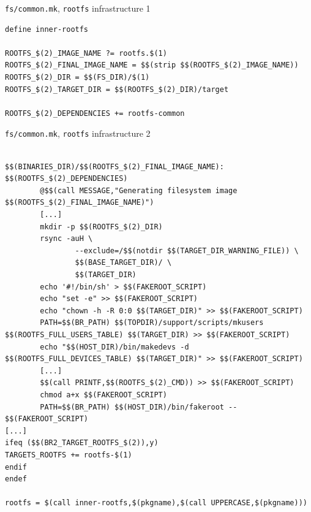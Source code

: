 \begin{frame}[fragile]{{\tt fs/common.mk}, {\tt rootfs} infrastructure 1}
  \begin{block}{}
\begin{verbatim}
define inner-rootfs

ROOTFS_$(2)_IMAGE_NAME ?= rootfs.$(1)
ROOTFS_$(2)_FINAL_IMAGE_NAME = $$(strip $$(ROOTFS_$(2)_IMAGE_NAME))
ROOTFS_$(2)_DIR = $$(FS_DIR)/$(1)
ROOTFS_$(2)_TARGET_DIR = $$(ROOTFS_$(2)_DIR)/target

ROOTFS_$(2)_DEPENDENCIES += rootfs-common
\end{verbatim}
  \end{block}
\end{frame}

\begin{frame}[fragile]{{\tt fs/common.mk}, {\tt rootfs} infrastructure 2}
  \begin{block}{}
\begin{verbatim}

$$(BINARIES_DIR)/$$(ROOTFS_$(2)_FINAL_IMAGE_NAME): $$(ROOTFS_$(2)_DEPENDENCIES)
        @$$(call MESSAGE,"Generating filesystem image $$(ROOTFS_$(2)_FINAL_IMAGE_NAME)")
        [...]
        mkdir -p $$(ROOTFS_$(2)_DIR)
        rsync -auH \
                --exclude=/$$(notdir $$(TARGET_DIR_WARNING_FILE)) \
                $$(BASE_TARGET_DIR)/ \
                $$(TARGET_DIR)
        echo '#!/bin/sh' > $$(FAKEROOT_SCRIPT)
        echo "set -e" >> $$(FAKEROOT_SCRIPT)
        echo "chown -h -R 0:0 $$(TARGET_DIR)" >> $$(FAKEROOT_SCRIPT)
        PATH=$$(BR_PATH) $$(TOPDIR)/support/scripts/mkusers $$(ROOTFS_FULL_USERS_TABLE) $$(TARGET_DIR) >> $$(FAKEROOT_SCRIPT)
        echo "$$(HOST_DIR)/bin/makedevs -d $$(ROOTFS_FULL_DEVICES_TABLE) $$(TARGET_DIR)" >> $$(FAKEROOT_SCRIPT)
        [...]
        $$(call PRINTF,$$(ROOTFS_$(2)_CMD)) >> $$(FAKEROOT_SCRIPT)
        chmod a+x $$(FAKEROOT_SCRIPT)
        PATH=$$(BR_PATH) $$(HOST_DIR)/bin/fakeroot -- $$(FAKEROOT_SCRIPT)
[...]
ifeq ($$(BR2_TARGET_ROOTFS_$(2)),y)
TARGETS_ROOTFS += rootfs-$(1)
endif
endef

rootfs = $(call inner-rootfs,$(pkgname),$(call UPPERCASE,$(pkgname)))
    \end{verbatim}
  \end{block}
\end{frame}

